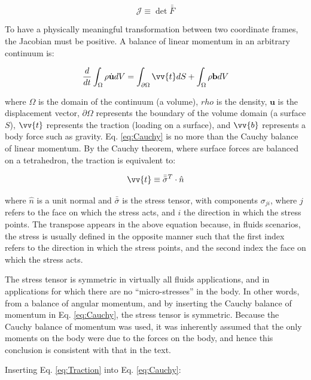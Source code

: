 \documentclass[10pt]{article}
\begin{document}
\begin{equation}
\mathscr{J}\equiv \det{\bar{\bar{F}}}
\end{equation}

To have a physically meaningful transformation between two coordinate frames, the Jacobian must be positive. A balance of linear momentum in an arbitrary continuum is:

\begin{equation}
\label{eq:Cauchy}
\frac{d}{dt}\int_{\Omega}\rho\dot{\textbf{u}}dV=\int_{\partial\Omega}\vv{t}dS+\int_{\Omega}\rho\textbf{b}dV
\end{equation}

where \(\Omega\) is the domain of the continuum (a volume), \(rho\) is the density, \(\textbf{u}\) is the displacement vector, \(\partial\Omega\) represents the boundary of the volume domain (a surface \(S\)), \(\vv{t}\) represents the traction (loading on a surface), and \(\vv{b}\) represents a body force such as gravity. Eq. \eqref{eq:Cauchy} is no more than the Cauchy balance of linear momentum. By the Cauchy theorem, where surface forces are balanced on a tetrahedron, the traction is equivalent to:

\begin{equation}
\label{eq:Traction}
\vv{t}\equiv\bar{\bar{\sigma}}^T\cdot\hat{n}
\end{equation}

where \(\hat{n}\) is a unit normal and \(\bar{\bar{\sigma}}\) is the stress tensor, with components \(\sigma_{ji}\), where \(j\) refers to the face on which the stress acts, and \(i\) the direction in which the stress points. The transpose appears in the above equation because, in fluids scenarios, the stress is usually defined in the opposite manner such that the first index refers to the direction in which the stress points, and the second index the face on which the stress acts.

The stress tensor is symmetric in virtually all fluids applications, and in applications for which there are no ``micro-stresses'' in the body. In other words, from a balance of angular momentum, and by inserting the Cauchy balance of momentum in Eq. \eqref{eq:Cauchy}, the stress tensor is symmetric. Because the Cauchy balance of momentum was used, it was inherently assumed that the only moments on the body were due to the forces on the body, and hence this conclusion is consistent with that in the text.

Inserting Eq. \eqref{eq:Traction} into Eq. \eqref{eq:Cauchy}:
\end{document}
